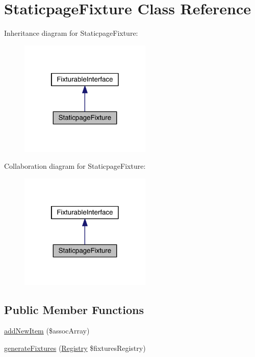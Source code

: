 \hypertarget{class_entity_1_1_staticpage_fixture}{\section{Staticpage\-Fixture Class Reference}
\label{class_entity_1_1_staticpage_fixture}
}


Inheritance diagram for Staticpage\-Fixture\-:
\nopagebreak
\begin{figure}[H]
\begin{center}
\leavevmode
\includegraphics[width=178pt]{class_entity_1_1_staticpage_fixture__inherit__graph}
\end{center}
\end{figure}


Collaboration diagram for Staticpage\-Fixture\-:
\nopagebreak
\begin{figure}[H]
\begin{center}
\leavevmode
\includegraphics[width=178pt]{class_entity_1_1_staticpage_fixture__coll__graph}
\end{center}
\end{figure}
\subsection*{Public Member Functions}
\begin{DoxyCompactItemize}
\item 
\hyperlink{class_entity_1_1_staticpage_fixture_a4ff07981a68955867c222fc0712e323a}{add\-New\-Item} (\$assoc\-Array)
\item 
\hyperlink{class_entity_1_1_staticpage_fixture_a60af9abed72c391727622c642cc4c612}{generate\-Fixtures} (\hyperlink{classapp_1_1models_1_1core_1_1_registry}{Registry} \$fixtures\-Registry)
\end{DoxyCompactItemize}
